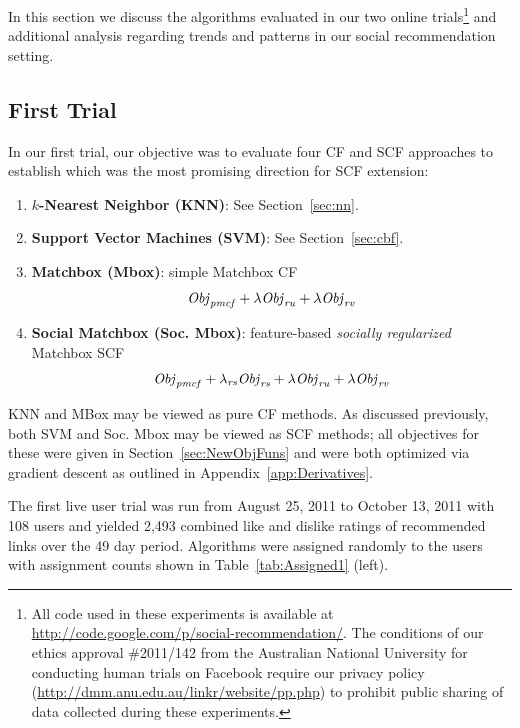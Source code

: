 In this section we discuss the algorithms evaluated in our two online
trials\footnote{All code used in these experiments is available at
\url{http://code.google.com/p/social-recommendation/}.  The conditions
of our ethics approval \#2011/142 from the Australian National
University for conducting human trials on Facebook require our
privacy policy
(\url{http://dmm.anu.edu.au/linkr/website/pp.php}) to
prohibit public sharing of data collected during these experiments.}
and additional analysis regarding trends and patterns in our social
recommendation setting.

\subsection{First Trial}

In our first trial, our objective was to evaluate four CF and SCF
approaches to establish which was the most promising direction for
SCF extension:
\begin{enumerate}
\item {\bf $k$-Nearest Neighbor (KNN)}: See Section~\ref{sec:nn}.
\item {\bf Support Vector Machines (SVM)}: See Section~\ref{sec:cbf}.
\item {\bf Matchbox (Mbox)}: simple Matchbox CF %
$$\mathit{Obj}_{\mathit{pmcf}} + \lambda \mathit{Obj}_{\mathit{ru}} + \lambda \mathit{Obj}_{\mathit{rv}}$$
\item {\bf Social Matchbox (Soc. Mbox)}: %
feature-based \emph{socially regularized} Matchbox SCF
$$\mathit{Obj}_{\mathit{pmcf}} + \lambda_{\mathit{rs}} \mathit{Obj}_{\mathit{rs}} + \lambda \mathit{Obj}_{\mathit{ru}} + \lambda \mathit{Obj}_{\mathit{rv}}$$
\end{enumerate}
KNN and MBox may be viewed as pure CF methods.  As discussed previously,
both SVM and Soc. Mbox may be viewed as SCF methods; all objectives
for these were given in Section~\ref{sec:NewObjFuns}
and were both optimized via gradient descent as outlined
in Appendix~\ref{app:Derivatives}.  

The first live user trial was run from August 25, 2011 to October 13, 2011 
with 108 users and yielded 2,493 combined like and 
dislike ratings of recommended
links over the 49 day period.  Algorithms were assigned randomly to the
users with assignment counts shown in Table~\ref{tab:Assigned1} (left).

